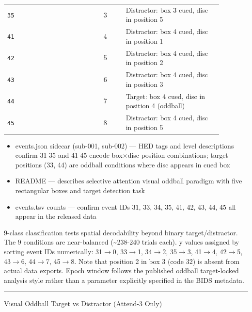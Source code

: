 {\begin{tcolorbox}
\begin{tabular}{@{}p{0.3911\linewidth}p{0.0978\linewidth}p{0.3911\linewidth}@{}}
\texttt{35} & 3 & Distractor: box 3 cued, disc in position 5 \\
\texttt{41} & 4 & Distractor: box 4 cued, disc in position 1 \\
\texttt{42} & 5 & Distractor: box 4 cued, disc in position 2 \\
\texttt{43} & 6 & Distractor: box 4 cued, disc in position 3 \\
\texttt{44} & 7 & Target: box 4 cued, disc in position 4 (oddball) \\
\texttt{45} & 8 & Distractor: box 4 cued, disc in position 5 \\
\bottomrule
\end{tabular}
\endgroup
\par{}\par
\begin{itemize}[leftmargin=1.3em,noitemsep,topsep=1pt]
\item[\scriptsize$\cdot$] {\scriptsize events.json sidecar (sub-001, sub-002) --- HED tags and level descriptions confirm 31-35 and 41-45 encode box$\times$disc position combinations; target positions (33, 44) are oddball conditions where disc appears in cued box}
\item[\scriptsize$\cdot$] {\scriptsize README --- describes selective attention visual oddball paradigm with five rectangular boxes and target detection task}
\item[\scriptsize$\cdot$] {\scriptsize events.tsv counts --- confirm event IDs 31, 33, 34, 35, 41, 42, 43, 44, 45 all appear in the released data}
\end{itemize}
\par{} {\footnotesize 9-class classification tests spatial decodability beyond binary target/distractor. The 9 conditions are near-balanced (\textasciitilde{}238-240 trials each). y values assigned by sorting event IDs numerically: 31$\rightarrow$0, 33$\rightarrow$1, 34$\rightarrow$2, 35$\rightarrow$3, 41$\rightarrow$4, 42$\rightarrow$5, 43$\rightarrow$6, 44$\rightarrow$7, 45$\rightarrow$8. Note that position 2 in box 3 (code 32) is absent from actual data exports. Epoch window follows the published oddball target-locked analysis style rather than a parameter explicitly specified in the BIDS metadata.}
\noindent\rule{\linewidth}{0.4pt}\par\nopagebreak
{} {\footnotesize Visual Oddball Target vs Distractor (Attend-3 Only)}\par\smallskip

\end{tcolorbox}}
